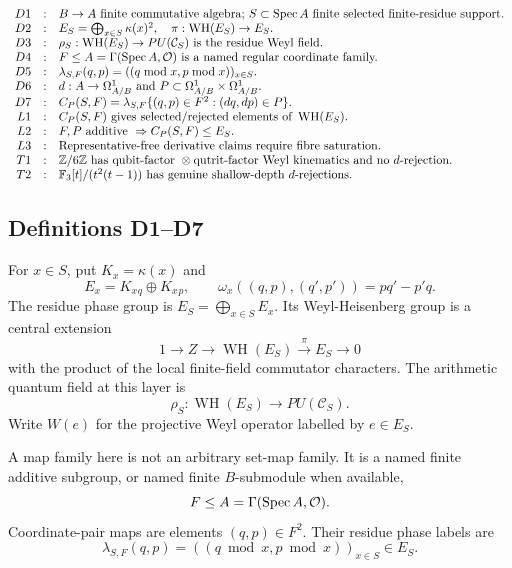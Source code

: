 \[
\begin{array}{rcl}
D1&:&B\to A\text{ finite commutative algebra; }S\subset\operatorname{Spec} A\text{ finite selected finite-residue support.}\\
D2&:&E_S=\bigoplus_{x\in S}\kappa(x)^2,\quad
      \pi:\operatorname{WH}(E_S)\to E_S.\\
D3&:&\rho_S:\operatorname{WH}(E_S)\to PU(\mathcal C_S)\text{ is the residue Weyl field.}\\
D4&:&F\leq A=\Gamma(\operatorname{Spec} A,\mathcal O)\text{ is a named regular coordinate family.}\\
D5&:&\lambda_{S,F}(q,p)=((q\bmod x,p\bmod x))_{x\in S}.\\
D6&:&d:A\to\Omega^1_{A/B}\text{ and }P\subset\Omega^1_{A/B}\times\Omega^1_{A/B}.\\
D7&:&C_P(S,F)=\lambda_{S,F}\{(q,p)\in F^2:(dq,dp)\in P\}.\\
L1&:&C_P(S,F)\text{ gives selected/rejected elements of }\operatorname{WH}(E_S).\\
L2&:&F,P\text{ additive }\Rightarrow C_P(S,F)\leq E_S.\\
L3&:&\text{Representative-free derivative claims require fibre saturation.}\\
T1&:&\mathbb Z/6\mathbb Z\text{ has qubit-factor }\otimes\text{qutrit-factor Weyl kinematics and no }d\text{-rejection.}\\
T2&:&\mathbb F_3[t]/(t^2(t-1))\text{ has genuine shallow-depth }d\text{-rejections.}
\end{array}
\]

\subsection{Definitions D1--D7}

For \(x\in S\), put \(K_x=\kappa(x)\) and
\[
  E_x=K_x{}_q\oplus K_x{}_p,\qquad
  \omega_x((q,p),(q',p'))=pq'-p'q .
\]
The residue phase group is \(E_S=\bigoplus_{x\in S}E_x\).  Its
Weyl-Heisenberg group is a central extension
\[
  1\to Z\to\operatorname{WH}(E_S)\xrightarrow{\pi}E_S\to0
\]
with the product of the local finite-field commutator characters.  The
arithmetic quantum field at this layer is
\[
  \rho_S:\operatorname{WH}(E_S)\to PU(\mathcal C_S).
\]
Write \(W(e)\) for the projective Weyl operator labelled by \(e\in E_S\).

A map family here is not an arbitrary set-map family.  It is a named finite
additive subgroup, or named finite \(B\)-submodule when available,
\[
  F\leq A=\Gamma(\operatorname{Spec} A,\mathcal O).
\]
Coordinate-pair maps are elements \((q,p)\in F^2\).  Their residue phase
labels are
\[
  \lambda_{S,F}(q,p)=((q\bmod x,p\bmod x))_{x\in S}\in E_S .
\]

